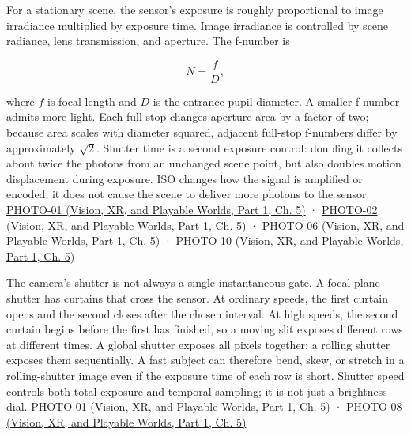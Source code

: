 For a stationary scene, the sensor's exposure is roughly proportional to image irradiance multiplied by exposure time. Image irradiance is controlled by scene radiance, lens transmission, and aperture. The f-number is

\[
N=\frac{f}{D},
\]

where \(f\) is focal length and \(D\) is the entrance-pupil diameter. A smaller f-number admits more light. Each full stop changes aperture area by a factor of two; because area scales with diameter squared, adjacent full-stop f-numbers differ by approximately \(\sqrt 2\). Shutter time is a second exposure control: doubling it collects about twice the photons from an unchanged scene point, but also doubles motion displacement during exposure. ISO changes how the signal is amplified or encoded; it does not cause the scene to deliver more photons to the sensor. \href{../07-Vision-XR-and-Playable-Worlds-P01/main.pdf\#nameddest=04-visual-computing-ii-ch036-photo-01---photography-session-01}{PHOTO-01 (Vision, XR, and Playable Worlds, Part 1, Ch. 5)} · \href{../07-Vision-XR-and-Playable-Worlds-P01/main.pdf\#nameddest=04-visual-computing-ii-ch036-photo-02---photography-session-02}{PHOTO-02 (Vision, XR, and Playable Worlds, Part 1, Ch. 5)} · \href{../07-Vision-XR-and-Playable-Worlds-P01/main.pdf\#nameddest=04-visual-computing-ii-ch036-photo-06---photography-session-06}{PHOTO-06 (Vision, XR, and Playable Worlds, Part 1, Ch. 5)} · \href{../07-Vision-XR-and-Playable-Worlds-P01/main.pdf\#nameddest=04-visual-computing-ii-ch036-photo-10---photography-session-10}{PHOTO-10 (Vision, XR, and Playable Worlds, Part 1, Ch. 5)}

The camera's shutter is not always a single instantaneous gate. A focal-plane shutter has curtains that cross the sensor. At ordinary speeds, the first curtain opens and the second closes after the chosen interval. At high speeds, the second curtain begins before the first has finished, so a moving slit exposes different rows at different times. A global shutter exposes all pixels together; a rolling shutter exposes them sequentially. A fast subject can therefore bend, skew, or stretch in a rolling-shutter image even if the exposure time of each row is short. Shutter speed controls both total exposure and temporal sampling; it is not just a brightness dial. \href{../07-Vision-XR-and-Playable-Worlds-P01/main.pdf\#nameddest=04-visual-computing-ii-ch036-photo-01---photography-session-01}{PHOTO-01 (Vision, XR, and Playable Worlds, Part 1, Ch. 5)} · \href{../07-Vision-XR-and-Playable-Worlds-P01/main.pdf\#nameddest=04-visual-computing-ii-ch036-photo-08---photography-session-08}{PHOTO-08 (Vision, XR, and Playable Worlds, Part 1, Ch. 5)}

